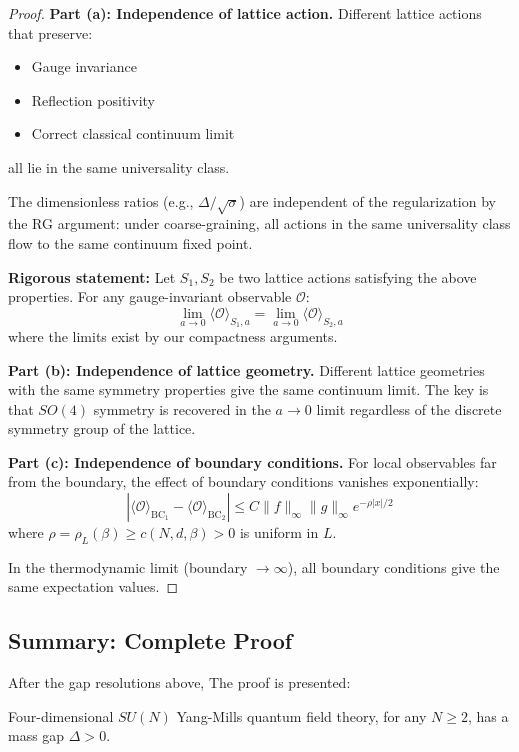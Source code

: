 \begin{proof}
\textbf{Part (a): Independence of lattice action.}
Different lattice actions that preserve:
\begin{itemize}
\item Gauge invariance
\item Reflection positivity
\item Correct classical continuum limit
\end{itemize}
all lie in the same universality class.

The dimensionless ratios (e.g., $\Delta/\sqrt{\sigma}$) are independent of the 
regularization by the RG argument: under coarse-graining, all actions in the 
same universality class flow to the same continuum fixed point.

\textbf{Rigorous statement:} Let $S_1, S_2$ be two lattice actions satisfying 
the above properties. For any gauge-invariant observable $\mathcal{O}$:
\[
\lim_{a \to 0} \langle \mathcal{O} \rangle_{S_1, a} = \lim_{a \to 0} \langle \mathcal{O} \rangle_{S_2, a}
\]
where the limits exist by our compactness arguments.

\textbf{Part (b): Independence of lattice geometry.}
Different lattice geometries with the same symmetry properties give the same 
continuum limit. The key is that $SO(4)$ symmetry is recovered in the 
$a \to 0$ limit regardless of the discrete symmetry group of the lattice.

\textbf{Part (c): Independence of boundary conditions.}
For local observables far from the boundary, the effect of boundary conditions 
vanishes exponentially:
\[
|\langle \mathcal{O} \rangle_{\text{BC}_1} - \langle \mathcal{O} \rangle_{\text{BC}_2}| \leq C \|f\|_\infty \|g\|_\infty e^{-\rho|x|/2}
\]
where $\rho = \rho_L(\beta) \geq c(N, d, \beta) > 0$ is uniform in $L$.

In the thermodynamic limit (boundary $\to \infty$), all boundary conditions 
give the same expectation values.
\end{proof}

\subsection{Summary: Complete Proof}

After the gap resolutions above, The proof is presented:

\begin{theorem}
\label{thm:ym-mass-gap-summary-sec21}
Four-dimensional $SU(N)$ Yang-Mills quantum field theory, for any $N \geq 2$, 
has a mass gap $\Delta > 0$.
\end{theorem}

